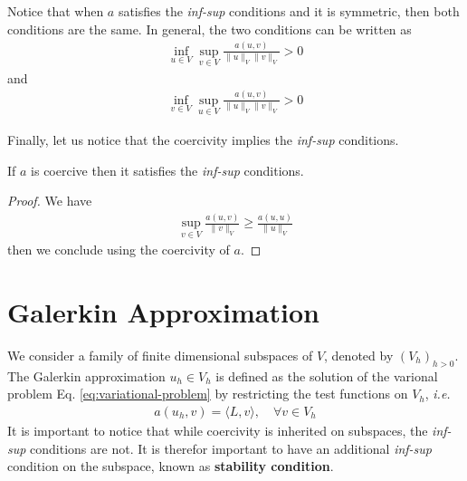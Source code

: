 \begin{remark}
  Notice that when $a$ satisfies the \textit{inf-sup} conditions and it is symmetric, then both conditions are the same. In general, the two conditions can be written as
  \begin{align*}
         \inf\limits_{u \in V} \sup\limits_{v \in V} \frac{a(u,v)}{\| u \|_V \| v \|_V} > 0 
  \end{align*}
  and
  \begin{align*}
         \inf\limits_{v \in V} \sup\limits_{u \in V} \frac{a(u,v)}{\| u \|_V \| v \|_V} > 0 
  \end{align*}
\end{remark}
Finally, let us notice that the coercivity implies the \textit{inf-sup} conditions.
\begin{lemma}
  If $a$ is coercive then it satisfies the \textit{inf-sup} conditions. 
  \label{lemma:coer-to-infsup}
\end{lemma}
\begin{proof}
  We have 
  \begin{align*}
       \sup\limits_{v \in V} \frac{a(u,v)}{\| v \|_V} \geq \frac{a(u,u)}{\| u \|_V}
  \end{align*}
  then we conclude using the coercivity of $a$.
\end{proof}


\section{Galerkin Approximation}
We consider a family of finite dimensional subspaces of $V$, denoted by $\left( V_h \right)_{h > 0}$.
The Galerkin approximation $u_h \in V_h$ is defined as the solution of the varional problem Eq. \eqref{eq:variational-problem} by restricting the test functions on $V_h$, \textit{i.e.}
\begin{align}
  a(u_h,v) = \langle L, v \rangle, \quad \forall v \in V_h
  \label{eq:galerkin-approx}
\end{align}
It is important to notice that while coercivity is inherited on subspaces, the \textit{inf-sup} conditions are not. It is therefor important to have an additional \textit{inf-sup} condition on the subspace, known as \textbf{stability condition}.

